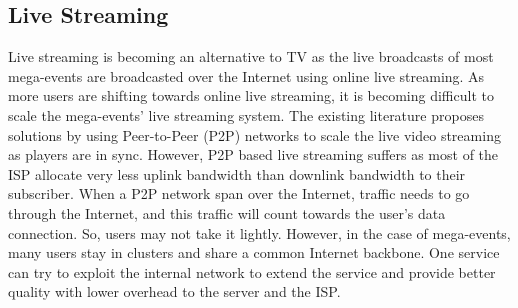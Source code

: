 \subsection{Live Streaming}
Live streaming is becoming an alternative to TV as the live broadcasts of most mega-events are broadcasted over the Internet using online live streaming. As more users are shifting towards online live streaming, it is becoming difficult to scale the mega-events' live streaming system. The existing literature proposes solutions by using Peer-to-Peer (P2P) networks to scale the live video streaming as players are in sync. However, P2P based live streaming suffers as most of the ISP allocate very less uplink bandwidth than downlink bandwidth to their subscriber. 
When a P2P network span over the Internet, traffic needs to go through the Internet, and this traffic will count towards the user's data connection. So, users may not take it lightly. However, in the case of mega-events, many users stay in clusters and share a common Internet backbone. One service can try to exploit the internal network to extend the service and provide better quality with lower overhead to the server and the ISP.
